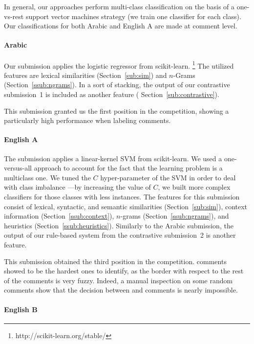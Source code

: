 In general, our approaches perform multi-class classification on the basis of a 
one-vs-rest support vector machines strategy (\ie we train one classifier for 
each class). Our classifications for both Arabic and English A are made at 
comment level.


\paragraph{Arabic} 
Our submission applies the logistic regressor from scikit-learn.%
\footnote{http://scikit-learn.org/stable/}
The utilized features are lexical similarities (Section~\ref{sub:sim}) and  
$n$-Grams (Section~\ref{ssub:ngrams}). In a sort of stacking, the output of 
our contrastive submission~1 is included as another feature (\cf 
Section~\ref{sub:contrastive}). 

This submission granted us the first position in the competition, showing a 
particularly high performance when labeling \rel comments.

\paragraph{English A}
The submission applies a linear-kernel SVM from scikit-learn. We used a 
one-versus-all approach to account for the fact that the learning problem is a 
multiclass one. We tuned the $C$ hyper-parameter of the SVM in order to deal 
with class imbalance ---by increasing the value of $C$, we built more complex 
classifiers for those classes with less instances. The features for this 
submission consist of lexical, syntactic, and semantic similarities 
(Section~\ref{sub:sim}), context information 
(Section~\ref{ssub:context}), $n$-grams (Section~\ref{ssub:ngrams}), and 
heuristics (Section~\ref{ssub:heuristics}). Similarly to the Arabic submission, 
the output of our rule-based system from the contrastive submission~2 is 
another feature. 

This submission obtained the third position in the competition. \pot comments 
showed to be the hardest ones to identify, as the border with respect to the 
rest of the comments is very fuzzy. Indeed, a manual inspection on some 
random comments show that the decision between \good and \pot comments is nearly 
impossible.

\paragraph{English B}


